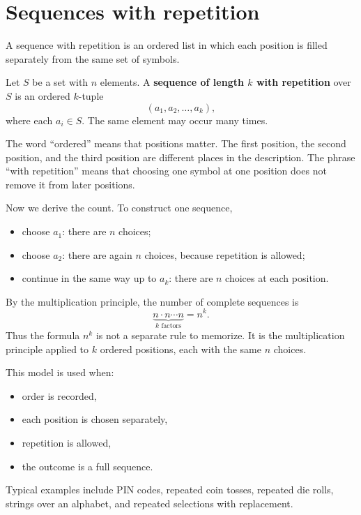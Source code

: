 \section{Sequences with repetition}

A sequence with repetition is an ordered list in which each position is filled separately from the same set of symbols.

\begin{definitionbox}
Let \(S\) be a set with \(n\) elements. A \textbf{sequence of length \(k\) with repetition} over \(S\) is an ordered \(k\)-tuple
\[
(a_1,a_2,\ldots,a_k),
\]
where each \(a_i\in S\). The same element may occur many times.
\end{definitionbox}

The word ``ordered'' means that positions matter. The first position, the second position, and the third position are different places in the description. The phrase ``with repetition'' means that choosing one symbol at one position does not remove it from later positions.

Now we derive the count. To construct one sequence,
\begin{itemize}
    \item choose \(a_1\): there are \(n\) choices;
    \item choose \(a_2\): there are again \(n\) choices, because repetition is allowed;
    \item continue in the same way up to \(a_k\): there are \(n\) choices at each position.
\end{itemize}
By the multiplication principle, the number of complete sequences is
\[
\underbrace{n\cdot n\cdots n}_{k\text{ factors}}=n^k.
\]
Thus the formula \(n^k\) is not a separate rule to memorize. It is the multiplication principle applied to \(k\) ordered positions, each with the same \(n\) choices.

This model is used when:
\begin{itemize}
    \item order is recorded,
    \item each position is chosen separately,
    \item repetition is allowed,
    \item the outcome is a full sequence.
\end{itemize}

Typical examples include PIN codes, repeated coin tosses, repeated die rolls, strings over an alphabet, and repeated selections with replacement.

